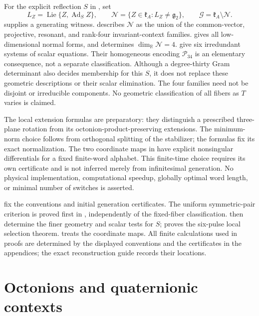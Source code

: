 \documentclass[11pt,a4paper]{article}
\newcommand{\RR}{\mathbb R}
\newcommand{\Lie}{\operatorname{Lie}}
\newcommand{\Ad}{\operatorname{Ad}}
\begin{document}
For the explicit reflection $S$ in , set
\[
L_Z=\Lie\{Z,\Ad_S Z\},\qquad
\mathcal N=\{Z\in\mathfrak k_A:L_Z\ne\mathfrak g_2\},\qquad
\mathcal G=\mathfrak k_A\setminus\mathcal N.
\]
 supplies a generating witness.
 describes $\mathcal N$ as the union of the common-vector, projective, resonant, and rank-four invariant-context families.
 gives all low-dimensional normal forms, and  determines $\dim_\RR\mathcal N=4$.
 give six irredundant systems of scalar equations.  Their homogeneous encoding $\mathcal P_{34}$ is an elementary consequence, not a separate classification.
Although a degree-thirty Gram determinant also decides membership for this $S$, it does not replace these geometric descriptions or their scalar elimination.
The four families need not be disjoint or irreducible components.  No geometric classification of all fibers as $T$ varies is claimed.

The local extension formulas are preparatory: they distinguish a prescribed three-plane rotation from its octonion-product-preserving extensions.
The minimum-norm choice follows from orthogonal splitting of the stabilizer; the formulas fix its exact normalization.
The two coordinate maps in  have explicit nonsingular differentials for a fixed finite-word alphabet.  This finite-time choice requires its own certificate and is not inferred merely from infinitesimal generation.
No physical implementation, computational speedup, globally optimal word length, or minimal number of switches is asserted.

 fix the conventions and initial generation certificates.
The uniform symmetric-pair criterion is proved first in , independently of the fixed-fiber classification.
 then determine the finer geometry and scalar tests for $S$;  proves the six-pulse local selection theorem.
 treats the coordinate maps.  All finite calculations used in proofs are determined by the displayed conventions and the certificates in the appendices; the exact reconstruction guide records their locations.

\section{Octonions and quaternionic contexts}
\label{sec:setting}
\end{document}
